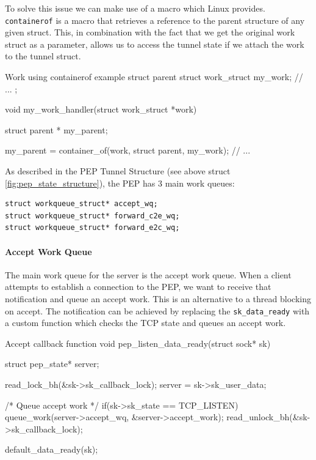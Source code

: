 \documentclass[a4paper,english, 12pt]{report}
\begin{document}
To solve this issue we can make use of a macro which Linux provides. \verb|containerof| is a macro that retrieves a reference to the parent structure of any given struct. This, in combination with the fact that we get the original work struct as a parameter, allows us to access the tunnel state if we attach the work to the tunnel struct.\\

\begin{autonumlstlisting}[label=lst:work_containerof]{Work using containerof example}
struct parent {
    struct work_struct my_work;
    // ...
};

void my_work_handler(struct work_struct *work)
{
   struct parent * my_parent;

   my_parent = container_of(work, struct parent,  my_work);
   // ...
}
\end{autonumlstlisting}

As described in the PEP Tunnel Structure (see above struct \ref{fig:pep_state_structure}), the PEP has 3 main work queues:
\begin{verbatim}
struct workqueue_struct* accept_wq;
struct workqueue_struct* forward_c2e_wq;
struct workqueue_struct* forward_e2c_wq;
\end{verbatim}

\paragraph{Accept Work Queue}
The main work queue for the server is the accept work queue. When a client attempts to establish a connection to the PEP, we want to receive that notification and queue an accept work. This is an alternative to a thread blocking on accept. The notification can be achieved by replacing the \verb|sk_data_ready| with a custom function which checks the TCP state and queues an accept work.\\

\begin{autonumlstlisting}[label=lst:pep_accept_callback]{Accept callback function}
void pep_listen_data_ready(struct sock* sk)
{
	struct pep_state* server;

	read_lock_bh(&sk->sk_callback_lock);
	server = sk->sk_user_data;

	/* Queue accept work */
	if(sk->sk_state == TCP_LISTEN){
		queue_work(server->accept_wq, &server->accept_work);
	}
	read_unlock_bh(&sk->sk_callback_lock);

	default_data_ready(sk);
}
\end{autonumlstlisting}
\end{document}
